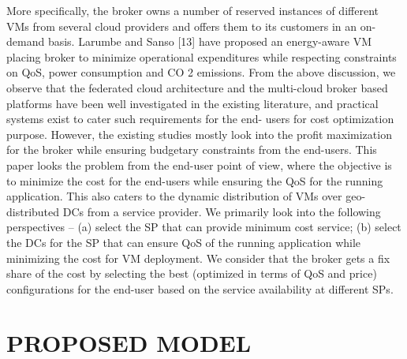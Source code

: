 \documentclass[conference]{IEEEtran}
\newcommand\tab[1][0.8cm]{\hspace*{#1}}
\begin{document}
More specifically, the broker owns a number of reserved
instances of different VMs from several cloud providers and
offers them to its customers in an on-demand basis. Larumbe
and Sanso [13] have proposed an energy-aware VM placing
broker to minimize operational expenditures while respecting
constraints on QoS, power consumption and CO 2 emissions.
\newline
\tab From the above discussion, we observe that the federated
cloud architecture and the multi-cloud broker based platforms
have been well investigated in the existing literature, and practical systems exist to cater such requirements for the end-
users for cost optimization purpose. However, the existing
studies mostly look into the profit maximization for the broker
while ensuring budgetary constraints from the end-users. This
paper looks the problem from the end-user point of view,
where the objective is to minimize the cost for the end-users
while ensuring the QoS for the running application. This also
caters to the dynamic distribution of VMs over geo-distributed
DCs from a service provider. We primarily look into the
following perspectives – (a) select the SP that can provide
minimum cost service; (b) select the DCs for the SP that can
ensure QoS of the running application while minimizing the
cost for VM deployment. We consider that the broker gets a
fix share of the cost by selecting the best (optimized in terms
of QoS and price) configurations for the end-user based on the
service availability at different SPs.

\section{PROPOSED MODEL}
\end{document}
